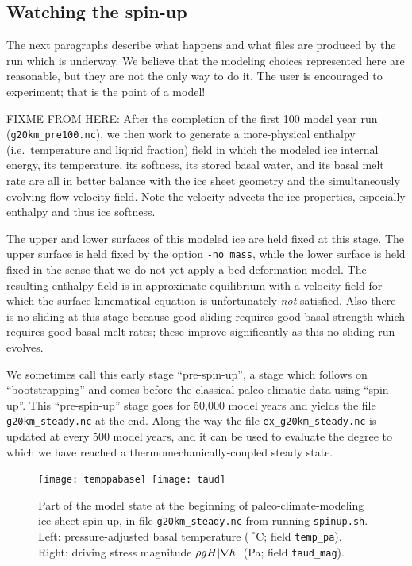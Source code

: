 \subsection{Watching the spin-up}  \label{subsect:spinupsketch}  The next paragraphs describe what happens and what files are produced by the run which is underway.  We believe that the modeling choices represented here are reasonable, but they are not the only way to do it.  The user is encouraged to experiment; that is the point of a model!

FIXME FROM HERE:  After the completion of the first 100 model year run (\texttt{g20km_pre100.nc}), we then work to generate a more-physical enthalpy (i.e.~temperature and liquid fraction) field in which the modeled ice internal energy, its temperature, its softness, its stored basal water, and its basal melt rate are all in better balance with the ice sheet geometry and the simultaneously evolving flow velocity field.  Note the velocity advects the ice properties, especially enthalpy and thus ice softness.

The upper and lower surfaces of this modeled ice are held fixed at this stage.  The upper surface is held fixed by the option \texttt{-no_mass}, while the lower surface is held fixed in the sense that we do not yet apply a bed deformation model.  The resulting enthalpy field is in approximate equilibrium with a velocity field for which the surface kinematical equation \cite{Fowler} is unfortunately \emph{not} satisfied.  Also there is no sliding at this stage because good sliding requires good basal strength which requires good basal melt rates; these improve significantly as this no-sliding run evolves.

We sometimes call this early stage ``pre-spin-up'', a stage which follows on ``bootstrapping'' and comes before the classical paleo-climatic data-using ``spin-up''.  This ``pre-spin-up'' stage goes for 50,000 model years and yields the file \texttt{g20km_steady.nc} at the end.  Along the way the file \texttt{ex_g20km_steady.nc} is updated at every 500 model years, and it can be used to evaluate the degree to which we have reached a thermomechanically-coupled steady state.


\begin{figure}[ht]
\centering
\mbox{\texttt{[image: temppabase]}
  \qquad \texttt{[image: taud]}}
\caption{Part of the model state at the beginning of paleo-climate-modeling ice sheet spin-up, in file \texttt{g20km_steady.nc} from running \texttt{spinup.sh}.  Left: pressure-adjusted basal temperature ($\phantom{|}^\circ$C; field \texttt{temp_pa}).  Right: driving stress magnitude $\rho g H |\nabla h|$ (Pa; field \texttt{taud_mag}).}
\label{fig:sr-spinstart}
\end{figure}

